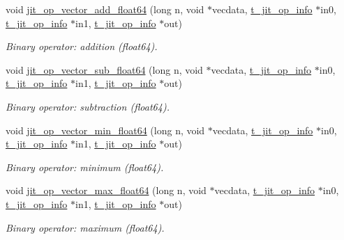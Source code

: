 \begin{DoxyCompactItemize}
void \hyperlink{group__opvecmod_gacd8f8cd6465da63a372b0b613d6da9ff}{jit\_\-op\_\-vector\_\-add\_\-float64} (long n, void $\ast$vecdata, \hyperlink{structt__jit__op__info}{t\_\-jit\_\-op\_\-info} $\ast$in0, \hyperlink{structt__jit__op__info}{t\_\-jit\_\-op\_\-info} $\ast$in1, \hyperlink{structt__jit__op__info}{t\_\-jit\_\-op\_\-info} $\ast$out)
\begin{DoxyCompactList}\small\item\em Binary operator: addition (float64). \item\end{DoxyCompactList}\item 
void \hyperlink{group__opvecmod_gaccb4600e174f75b40a45144986dbfe01}{jit\_\-op\_\-vector\_\-sub\_\-float64} (long n, void $\ast$vecdata, \hyperlink{structt__jit__op__info}{t\_\-jit\_\-op\_\-info} $\ast$in0, \hyperlink{structt__jit__op__info}{t\_\-jit\_\-op\_\-info} $\ast$in1, \hyperlink{structt__jit__op__info}{t\_\-jit\_\-op\_\-info} $\ast$out)
\begin{DoxyCompactList}\small\item\em Binary operator: subtraction (float64). \item\end{DoxyCompactList}\item 
void \hyperlink{group__opvecmod_gaecf137738b7cecc8da5507d295cbac11}{jit\_\-op\_\-vector\_\-min\_\-float64} (long n, void $\ast$vecdata, \hyperlink{structt__jit__op__info}{t\_\-jit\_\-op\_\-info} $\ast$in0, \hyperlink{structt__jit__op__info}{t\_\-jit\_\-op\_\-info} $\ast$in1, \hyperlink{structt__jit__op__info}{t\_\-jit\_\-op\_\-info} $\ast$out)
\begin{DoxyCompactList}\small\item\em Binary operator: minimum (float64). \item\end{DoxyCompactList}\item 
void \hyperlink{group__opvecmod_ga7faee9edbbe6f5583f4c38ff39ddb5de}{jit\_\-op\_\-vector\_\-max\_\-float64} (long n, void $\ast$vecdata, \hyperlink{structt__jit__op__info}{t\_\-jit\_\-op\_\-info} $\ast$in0, \hyperlink{structt__jit__op__info}{t\_\-jit\_\-op\_\-info} $\ast$in1, \hyperlink{structt__jit__op__info}{t\_\-jit\_\-op\_\-info} $\ast$out)
\begin{DoxyCompactList}\small\item\em Binary operator: maximum (float64). \item\end{DoxyCompactList}\item 

\end{DoxyCompactItemize}
